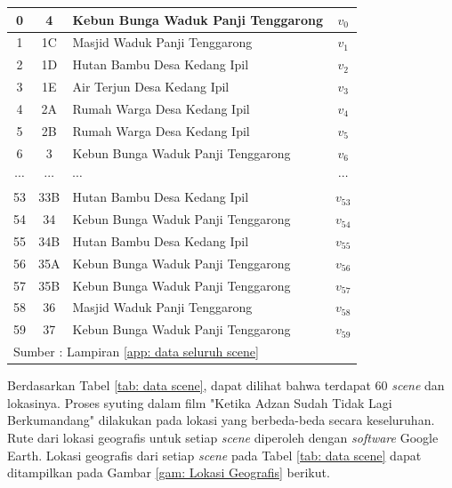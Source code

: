 {{\begin{tabularx}{\textwidth}{|c|c|l|c|}
    0               & 4                       & Kebun Bunga Waduk   Panji Tenggarong & $v_{0}$           \\ \hline
    1               & 1C                      & Masjid Waduk Panji Tenggarong        & $v_{1}$           \\ \hline
    2               & 1D                      & Hutan Bambu Desa Kedang Ipil         & $v_{2}$           \\ \hline
    3               & 1E                      & Air Terjun Desa Kedang Ipil          & $v_{3}$           \\ \hline
    4               & 2A                      & Rumah Warga Desa Kedang Ipil         & $v_{4}$           \\ \hline
    5               & 2B                      & Rumah Warga Desa Kedang Ipil         & $v_{5}$           \\ \hline
    6               & 3                       & Kebun Bunga Waduk Panji Tenggarong   & $v_{6}$           \\ \hline
    $\cdots$        & $\cdots$                & $\cdots$                             & $\cdots$          \\ \hline
    53              & 33B                     & Hutan Bambu Desa Kedang Ipil         & $v_{53}$          \\ \hline
    54              & 34                      & Kebun Bunga Waduk Panji Tenggarong   & $v_{54}$          \\ \hline
    55              & 34B                     & Hutan Bambu Desa Kedang Ipil         & $v_{55}$          \\ \hline
    56              & 35A                     & Kebun Bunga Waduk Panji Tenggarong   & $v_{56}$          \\ \hline
    57              & 35B                     & Kebun Bunga Waduk Panji Tenggarong   & $v_{57}$          \\ \hline
    58              & 36                      & Masjid Waduk Panji Tenggarong        & $v_{58}$          \\ \hline
    59              & 37                      & Kebun Bunga Waduk Panji Tenggarong   & $v_{59}$          \\ \hline
    \multicolumn{4}{l}{Sumber : Lampiran \ref{app: data seluruh scene}}
\end{tabularx}

Berdasarkan Tabel \ref{tab: data scene}, dapat dilihat bahwa terdapat 60 \textit{scene} dan lokasinya.
Proses syuting dalam film "Ketika Adzan Sudah Tidak Lagi Berkumandang" dilakukan pada lokasi yang berbeda-beda secara keseluruhan.
Rute dari lokasi geografis untuk setiap \textit{scene} diperoleh dengan \textit{software} Google Earth.
Lokasi geografis dari setiap \textit{scene} pada Tabel \ref{tab: data scene} dapat ditampilkan pada Gambar \ref{gam: Lokasi Geografis} berikut.

}}
